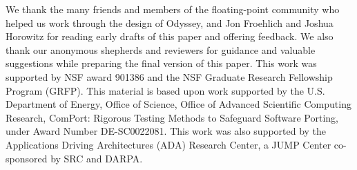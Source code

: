 \begin{acks}
We thank the many friends and members of the floating-point community who helped us work through the design of Odyssey, and Jon Froehlich and Joshua Horowitz 
for reading early drafts of this paper and offering feedback.
We also thank
our anonymous shepherds and reviewers for guidance
and valuable suggestions while preparing the final version of this
paper.
This work was supported by NSF award 901386 and the NSF Graduate Research Fellowship Program (GRFP).
This material is based upon work supported by the U.S. Department of Energy, Office of Science, Office of Advanced Scientific Computing Research, ComPort: Rigorous Testing Methods to Safeguard Software Porting, under Award Number DE-SC0022081. This work was also supported by the Applications Driving Architectures (ADA)
Research Center, a JUMP Center co-sponsored by SRC and DARPA.
\end{acks}